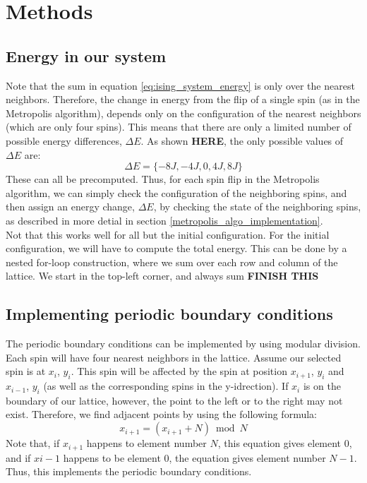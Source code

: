 \documentclass[a4paper, 10pt]{article}
\begin{document}
\section{Methods}
\subsection{Energy in our system}\label{energy_in_system}
Note that the sum in equation \ref{eq:ising_system_energy} is only over the nearest neighbors. Therefore, the change in energy from the flip of a single spin (as in the Metropolis algorithm), depends only on the configuration of the nearest neighbors (which are only four spins). This means that there are only a limited number of possible energy differences, $\Delta E$. As shown \textbf{HERE}, the only possible values of $\Delta E$ are:
$$\Delta E = \{ -8J, -4J, 0, 4J, 8J\}$$
These can all be precomputed. Thus, for each spin flip in the Metropolis algorithm, we can simply check the configuration of the neighboring spins, and then assign an energy change, $\Delta E$, by checking the state of the neighboring spins, as described in more detial in section \ref{metropolis_algo_implementation}.\\
\linebreak
Not that this works well for all but the initial configuration. For the initial configuration, we will have to compute the total energy. This can be done by a nested for-loop construction, where we sum over each row and column of the lattice. We start in the top-left corner, and always sum \textbf{FINISH THIS}
\subsection{Implementing periodic boundary conditions}
The periodic boundary conditions can be implemented by using modular division. Each spin will have four nearest neighbors in the lattice. Assume our selected spin is at $x_i$, $y_i$. This spin will be affected by the spin at position $x_{i+1}$, $y_i$ and $x_{i-1}$, $y_i$ (as well as the corresponding spins in the y-idrection). If $x_i$ is on the boundary of our lattice, however, the point to the left or to the right may not exist. Therefore, we find adjacent points by using the following formula:
\begin{equation}\label{eq:modular_arithmetic}
x_{i+1}=(x_{i+1}+N) \bmod N
\end{equation}
Note that, if $x_{i+1}$ happens to element number $N$, this equation gives element 0, and if $x{i-1}$ happens to be element 0, the equation gives element number $N-1$. Thus, this implements the periodic boundary conditions.
\end{document}
